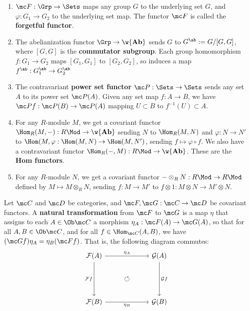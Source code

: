 \begin{ex}
    \begin{enumerate}
        \item $\mc F: \Grp \to \Sets$ maps any group $G$ to the underlying set $G$, and $\varphi :G_1 \to G_2$ to the underlying set map. The functor $\mc F$ is called the \textbf{forgetful functor}.
        \item The abelianization functor $\Grp \to \w{\textbf{Ab}}$ sends $G$ to $G^{\ab}:= G/[G,G]$, where $[G,G]$ is the \textbf{commutator subgroup}. Each group homomorphism $f: G_1 \to G_2$ maps $[G_1,G_1]$ to $[G_2,G_2]$, so induces a map $f^{\ab}: G_1^{\ab} \to G_2^{\ab}$
        \item The contravariant \textbf{power set functor} $\mc P: \Sets \to \Sets$ sends any set $A$ to its power set $\mc P(A)$. Given any set map $f:A \to B$, we have $\mc Pf: \mc P(B) \to \mc P(A)$ mapping $U \subset B$ to $f^{-1}(U) \subset A$.
        \item For any $R$-module $M$, we get a covariant functor $\Hom _R(M,-): R\Mod \to \w{\textbf{Ab}}$ sending $N$ to $\Hom _R(M,N)$ and $\varphi :N \to N'$ to $\Hom(M,\varphi : \Hom(M,N) \to \Hom(M,N')$, sending $f \mapsto \varphi \circ f$. We also have a contravariant functor $\Hom_R(-,M) : R\Mod \to \w{\textbf{Ab}}$. These are the \textbf{Hom functors}.
        \item For any $R$-module $N$, we get a covariant functor $- \otimes _RN : R\Mod \to R\Mod$ defined by $M \mapsto M \otimes _RN$, sending $f:M \to M'$ to $f \otimes 1:M \otimes N \to M' \otimes N$.
    \end{enumerate}
\end{ex}

\begin{defn}
    Let $\mc C$ and $\mc D$ be categories, and $\mc F,\mc G : \mc C \to \mc D$ be covariant functors. A \textbf{natural transformation} from $\mc F$ to $\mc G$ is a map $\eta$ that assigns to each $A \in \Ob \mc C$ a morphism $\eta _A: \mc F(A) \to \mc G(A)$, so that for all $A,B \in \Ob \mc C$, and for all $f \in \Hom _{\mc C}(A,B)$, we have $(\mc Gf)\eta _A = \eta _B(\mc Ff)$. That is, the following diagram commutes:
    \[\begin{tikzcd}[ampersand replacement=\&]
    	{\mathcal F(A)} \&\& {\mathcal G(A)} \\
    	\& \circlearrowleft \\
    	{\mathcal F(B)} \&\& {\mathcal G(B)}
    	\arrow["{\eta_A}", from=1-1, to=1-3]
    	\arrow["{\mathcal F f}"', from=1-1, to=3-1]
    	\arrow["{\mathcal Gf}", from=1-3, to=3-3]
    	\arrow["{\eta _B}"', from=3-1, to=3-3]
    \end{tikzcd}\]
\end{defn}

